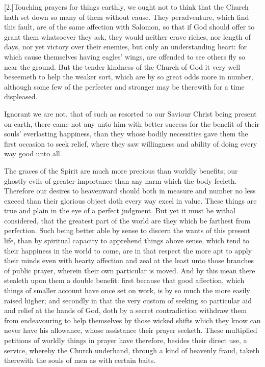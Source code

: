 [2.]Touching prayers for things earthly, we ought not to think that the Church hath set down so many of them without cause. They peradventure, which find this fault, are of the same affection with Salomon, so that if God should offer to grant them whatsoever they ask, they would neither crave riches, nor length of days, nor yet victory over their enemies, but only an understanding heart: for which cause themselves having eagles’ wings, are offended to see others fly so near the ground. But the tender kindness of the Church of God it very well beseemeth to help the weaker sort, which are by so great odds more in number, although some few of the perfecter and stronger may be therewith for a time displeased.

Ignorant we are not, that of such as resorted to our Saviour Christ being present on earth, there came not any unto him with better success for the benefit of their souls’ everlasting happiness, than they whose bodily necessities gave them the first occasion to seek relief, where they saw willingness and ability of doing every way good unto all.

The graces of the Spirit are much more precious than worldly benefits; our ghostly evils of greater importance than any harm which the body feeleth. Therefore our desires to heavenward should both in measure and number no less exceed than their glorious object doth every way excel in value. These things are true and plain in the eye of a perfect judgment. But yet it must be withal considered, that the greatest part of the world are they which be farthest from perfection. Such being better able by sense to discern the wants of this present life, than by spiritual capacity to apprehend things above sense, which tend to their happiness in the world to come, are in that respect the more apt to apply their minds even with hearty affection and zeal at the least unto those branches of public prayer, wherein their own particular is moved. And by this mean there stealeth upon them a double benefit: first because that good affection, which things of smaller account have once set on work, is by so much the more easily raised higher; and secondly in that the very  custom of seeking so particular aid and relief at the hands of God,
 doth by a secret contradiction withdraw them from endeavouring to help themselves by those wicked shifts which they know can never have his allowance, whose assistance their prayer seeketh. These multiplied petitions of worldly things in prayer have therefore, besides their direct use, a service, whereby the Church underhand, through a kind of heavenly fraud, taketh therewith the souls of men as with certain baits.


